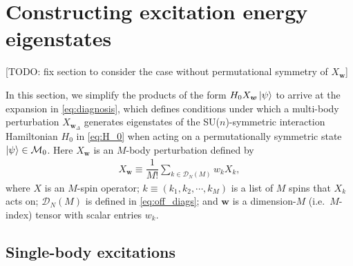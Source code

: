 \documentclass[nofootinbib,notitlepage,11pt]{revtex4-2}
\newcommand{\f}[2]{\dfrac{#1}{#2}} %
\newcommand{\p}[1]{\left(#1\right)} %
\newcommand{\m}{\bm} %
\newcommand{\1}{\mathds{1}}
\newcommand{\D}{\mathcal{D}}
\newcommand{\M}{\mathcal{M}}
\newcommand{\red}[1]{{\color{red} #1}}
\begin{document}
\section{Constructing excitation energy eigenstates}
\label{sec:eigenstates}

\red{[TODO: fix section to consider the case without permutational
  symmetry of $X_{\m w}$]}

In this section, we simplify the products of the form
$H_0X_{\m w}\ket\psi$ to arrive at the expansion in
\eqref{eq:diagnosis}, which defines conditions under which a
multi-body perturbation $X_{\m w_\Delta}$ generates eigenstates of the
SU($n$)-symmetric interaction Hamiltonian $H_0$ in \eqref{eq:H_0} when
acting on a permutationally symmetric state $\ket\psi\in\M_0$.  Here
$X_{\m w}$ is an $M$-body perturbation defined by
\begin{align}
  X_{\m w} \equiv \f1{M!} \sum_{k\in\D_N\p{M}} w_k X_k,
  \label{eq:pert_copy}
\end{align}
where $X$ is an $M$-spin operator; $k\equiv\p{k_1,k_2,\cdots,k_M}$ is
a list of $M$ spins that $X_k$ acts on; $\D_N\p{M}$ is defined in
\eqref{eq:off_diags}; and $\m w$ is a dimension-$M$ (i.e.~$M$-index)
tensor with scalar entries $w_k$.

\subsection{Single-body excitations}
\label{sec:single_body_eigenstates}
\end{document}
